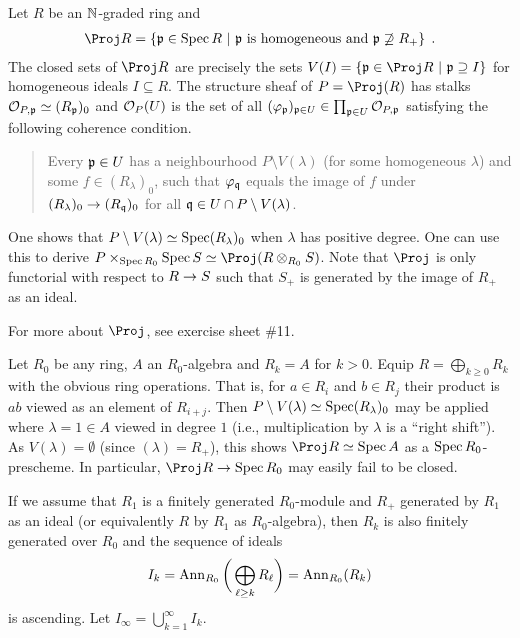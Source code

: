 \documentclass[a4paper,parskip=half,numbers=enddot, DIV=12]{scrreprt}
\begin{document}
\begin{defi}
    Let $R$ be an $\mathbb{N}$-graded ring and 
    \begin{align*}
        \Proj R = \left\{\pp\in\Spec R \st \pp \text{ is homogeneous and } \pp\not \supseteq R_+\right\}\;.
    \end{align*}
    The closed sets of $\Proj R$ are precisely the sets $V(I)=\left\{\pp\in\Proj R\st \pp\supseteq I\right\}$ for homogeneous ideals $I\subseteq R$. The structure sheaf of $P=\Proj (R)$ has stalks $\mathcal{O}_{P,\mathfrak{p}} \simeq (R_{\mathfrak{p}})_0$ and $\mathcal{O}_P(U)$ is the set of all $(\varphi_{\mathfrak{p}})_{\mathfrak{p}\in U}\in \prod_{\mathfrak{p}\in U} \mathcal{O}_{P,\mathfrak{p}}$ satisfying the following coherence condition. 
    \begin{quote}
    	Every $\mathfrak{p}\in U$ has a neighbourhood $P\setminus V(\lambda)$ (for some homogeneous $\lambda$) and some $f\in (R_\lambda)_0$, such that $\varphi_{\mathfrak{q}}$ equals the image of $f$ under $(R_\lambda)_0 \morphism (R_\qq)_0$ for all $\mathfrak{q}\in U\cap P\setminus V(\lambda)$. 
    \end{quote}
\end{defi}
    One shows that $P\setminus V(\lambda) \simeq \operatorname{Spec}(R_\lambda)_0$ when $\lambda$ has positive degree. One can use this to derive $P\times_{\Spec R_0} \Spec S \simeq \Proj(R\otimes_{R_0} S)$. Note that $\Proj$ is only functorial with respect to $R\morphism S$ such that $S_+$ is generated by the image of $R_+$ as an ideal.
    
    For more about $\Proj$, see exercise sheet \#11.
\begin{example}
    Let $R_0$ be any ring, $A$ an $R_0$-algebra and $R_k = A$ for $k>0$. Equip $R=\bigoplus_{k\geq 0}R_k$ with the obvious ring operations. That is, for $a\in R_i$ and $b\in R_j$ their product is $ab$ viewed as an element of $R_{i+j}$. Then $P\setminus V(\lambda) \simeq \operatorname{Spec}(R_\lambda)_0$ may be applied where $\lambda = 1\in A$ viewed in degree $1$ (i.e., multiplication by $\lambda$ is a ``right shift''). As $V(\lambda)=\emptyset$ (since $(\lambda)=R_+$), this shows $\Proj R\simeq \Spec A$ as a $\operatorname{Spec} R_0$-prescheme. In particular, $\Proj R\morphism \Spec R_0$ may easily fail to be closed.
\end{example}
If we assume that $R_1$ is a finitely generated $R_0$-module and $R_+$ generated by $R_1$ as an ideal (or equivalently $R$ by $R_1$ as $R_0$-algebra), then $R_k$ is also finitely generated over $R_0$ and the sequence of ideals 
\begin{align*}
    I_k = \operatorname{Ann}_{R_0}\bigg(\bigoplus_{\ell\geq k} R_\ell\bigg) = \operatorname{Ann}_{R_0} (R_k)
\end{align*}
is ascending. Let $I_\infty = \bigcup_{k=1}^\infty I_k$.
\end{document}
